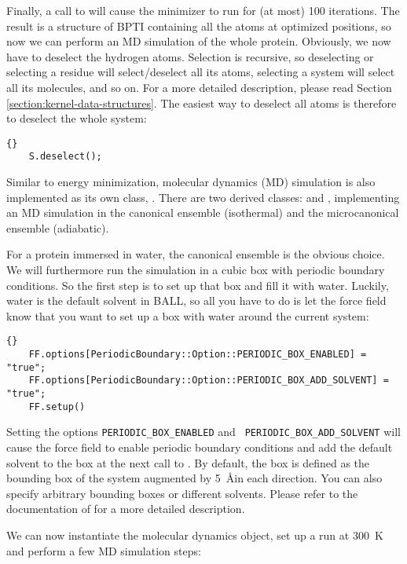 Finally, a call to  will cause the minimizer to run for
(at most) 100 iterations. The result is a structure of BPTI containing all
the atoms at optimized positions, so now we can perform an MD simulation of
the whole protein. Obviously, we now have to deselect the hydrogen atoms.
Selection is recursive, so deselecting or selecting a residue will
select/deselect all its atoms, selecting a system will select all its
molecules, and so on. For a more detailed description, please read Section
\ref{section:kernel-data-structures}. The easiest way to deselect all atoms is
therefore to deselect the whole system:

\begin{lstlisting}{}
	S.deselect();
\end{lstlisting}

\noindent
Similar to energy minimization, molecular dynamics (MD) simulation is also
implemented as its own class, . There are two derived
classes:  and , implementing an MD
simulation in the canonical ensemble (isothermal) and the microcanonical
ensemble (adiabatic). 

For a protein immersed in water, the canonical ensemble is the obvious choice.
We will furthermore run the simulation in a cubic box with periodic boundary 
conditions. So the first step is to set up that box and fill it with water.
Luckily, water is the default solvent in BALL, so all you have to do is
let the force field know that you want to set up a box with water around the
current system:

\begin{lstlisting}{}
	FF.options[PeriodicBoundary::Option::PERIODIC_BOX_ENABLED] = "true";
	FF.options[PeriodicBoundary::Option::PERIODIC_BOX_ADD_SOLVENT] = "true";
	FF.setup()
\end{lstlisting}

\noindent
Setting the options {\tt PERIODIC\_BOX\_ENABLED} and {\tt
PERIODIC\_BOX\_ADD\_SOLVENT} will cause the force field to enable periodic
boundary conditions and add the default solvent to the box at the next call
to . By default, the box is defined as the bounding box of the
system augmented by 5~\AA in each direction. You can also specify arbitrary
bounding boxes or different solvents. Please refer to the documentation of
 for a more detailed description.

We can now instantiate the molecular dynamics object, set up a run at 300~K and
perform a few  MD simulation steps:

